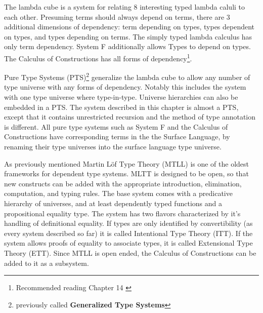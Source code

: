The lambda cube is a system for relating 8 interesting typed lambda caluli to each other.
Presuming terms should always depend on terms, there are 3 additional dimensions of dependency: term depending on types, types dependent on types, and types depending on terms.
The simply typed lambda calculus has only term dependency.
System F additionally allows Types to depend on types.
The Calculus of Constructions has all forms of dependency\footnote{Recommended reading Chapter 14 \cite{sorensen2006lectures}}.


Pure Type Systems (PTS)\footnote{previously called \textbf{Generalized Type Systems}} generalize the lambda cube to allow any number of type universe with any forms of dependency.
Notably this includes the system with one type universe where type-in-type.
Universe hierarchies can also be embedded in a PTS.
The system described in this chapter is almost a PTS, except that it contains unrestricted recursion and the method of type annotation is different.
All pure type systems such as System F and the Calculus of Constructions have corresponding terms in the the Surface Language, by renaming their type universes into the surface language type universe.



As previously mentioned Martin L{\"o}f Type Theory (MTLL) \cite{Martin-Lof-1972} is one of the oldest frameworks for dependent type systems.
MLTT is designed to be open, so that new constructs can be added with the appropriate introduction, elimination, computation, and typing rules.
The base system comes with a predicative hierarchy of universes, and at least dependently typed functions and a propositional equality type.
The system has two flavors characterized by it's handling of definitional equality.
If types are only identified by convertibility (as every system described so far) it is called Intentional Type Theory (ITT).
If the system allows proofs of equality to associate types, it is called Extensional Type Theory (ETT).
Since MTLL is open ended, the Calculus of Constructions can be added to it as a subsystem\cite{aspinall2004dependent,hofmann1997extensional}.



